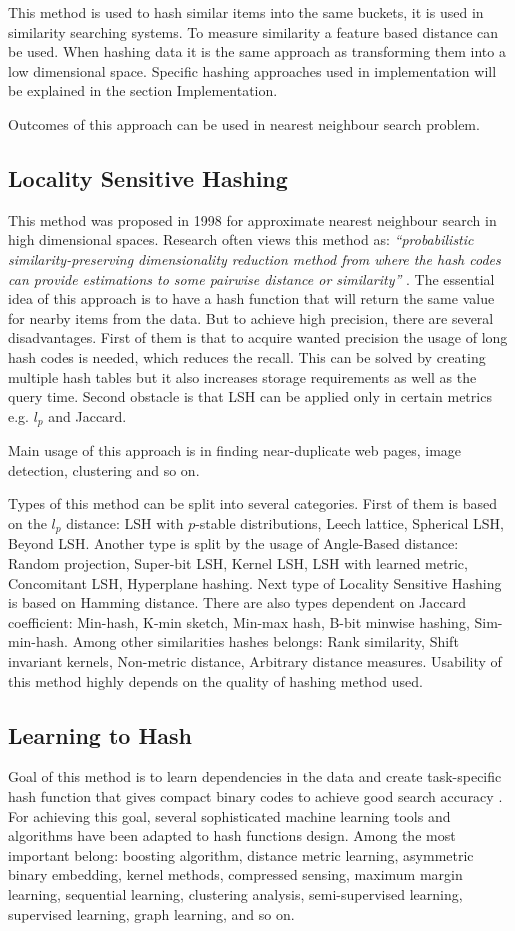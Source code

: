 This method is used to hash similar items into the same buckets, it is used in similarity searching systems. To measure similarity a feature based distance can be used. When hashing data it is the same approach as transforming them into a low dimensional space. Specific hashing approaches used in implementation will be explained in the section Implementation.

Outcomes of this approach can be used in nearest neighbour search problem.

\subsection{Locality Sensitive Hashing}\label{LSH}
This method was proposed in 1998 for approximate nearest neighbour search in high dimensional spaces. Research often views this method as: \textit{``probabilistic similarity-preserving dimensionality reduction method from where the hash codes can provide estimations to some pairwise distance or similarity''}  \cite{hashing}. The essential idea of this approach is to have a hash function that will return the same value for nearby items from the data. But to achieve high precision, there are several disadvantages. First of them is that to acquire wanted precision the usage of long hash codes is needed, which reduces the recall. This can be solved by creating multiple hash tables but it also increases storage requirements as well as the query time. Second obstacle is that LSH can be applied only in certain metrics e.g. $l_p$ and Jaccard. 

Main usage of this approach is in finding near-duplicate web pages, image detection, clustering and so on. 

Types of this method can be split into several categories.
First of them is based on the $l_p$ distance: LSH with $p$-stable distributions, Leech lattice, Spherical LSH, Beyond LSH.
Another type is split by the usage of Angle-Based distance: Random projection, Super-bit LSH, Kernel LSH, LSH with learned metric, Concomitant LSH, Hyperplane hashing.
Next type of Locality Sensitive Hashing is based on Hamming distance. There are also types dependent on Jaccard coefficient: Min-hash, K-min sketch, Min-max hash, B-bit minwise hashing, Sim-min-hash.
Among other similarities hashes belongs: Rank similarity, Shift invariant kernels, Non-metric distance, Arbitrary distance measures.
Usability of this method highly depends on the quality of hashing method used.

\subsection{Learning to Hash}
Goal of this method is to learn dependencies in the data and create task-specific hash function that gives compact binary codes to achieve good search accuracy \cite{learnHash}. For achieving this goal, several sophisticated machine learning tools and algorithms have been adapted to hash functions design. Among the most important belong: boosting algorithm, distance metric learning, asymmetric binary embedding, kernel methods, compressed sensing, maximum margin learning, sequential learning, clustering analysis, semi-supervised learning, supervised learning, graph learning, and so on.

